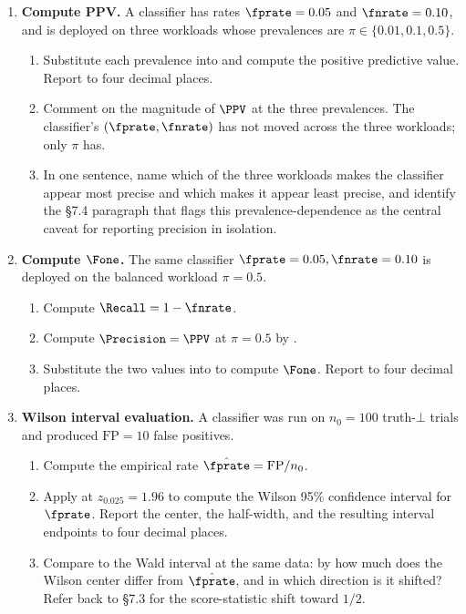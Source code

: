 \begin{enumerate}


\item \exstar
\label{ex:ch7-1}
\textbf{Compute PPV.}
A classifier has rates $\fprate = 0.05$ and $\fnrate = 0.10$, and is
deployed on three workloads whose prevalences are $\pi \in \{0.01,
0.1, 0.5\}$.
\begin{enumerate}
  \item[(a)] Substitute each prevalence into  and
    compute the positive predictive value. Report to four decimal
    places.
  \item[(b)] Comment on the magnitude of $\PPV$ at the three
    prevalences. The classifier's $(\fprate, \fnrate)$ has not
    moved across the three workloads; only $\pi$ has.
  \item[(c)] In one sentence, name which of the three workloads
    makes the classifier appear most precise and which makes it
    appear least precise, and identify the §7.4 paragraph that
    flags this prevalence-dependence as the central caveat for
    reporting precision in isolation.
\end{enumerate}

\item \exstar
\label{ex:ch7-2}
\textbf{Compute $\Fone$.}
The same classifier $\fprate = 0.05, \fnrate = 0.10$ is deployed on
the balanced workload $\pi = 0.5$.
\begin{enumerate}
  \item[(a)] Compute $\Recall = 1 - \fnrate$.
  \item[(b)] Compute $\Precision = \PPV$ at $\pi = 0.5$ by
    .
  \item[(c)] Substitute the two values into  to compute
    $\Fone$. Report to four decimal places.
\end{enumerate}

\item \exstar
\label{ex:ch7-3}
\textbf{Wilson interval evaluation.}
A classifier was run on $n_0 = 100$ truth-$\bot$ trials and produced
$\mathrm{FP} = 10$ false positives.
\begin{enumerate}
  \item[(a)] Compute the empirical rate
    $\hat{\fprate} = \mathrm{FP}/n_0$.
  \item[(b)] Apply  at $z_{0.025} = 1.96$ to
    compute the Wilson 95\% confidence interval for $\fprate$.
    Report the center, the half-width, and the resulting interval
    endpoints to four decimal places.
  \item[(c)] Compare to the Wald interval  at the
    same data: by how much does the Wilson center differ from
    $\hat{\fprate}$, and in which direction is it shifted? Refer
    back to §7.3 for the score-statistic shift toward $1/2$.
\end{enumerate}


\end{enumerate}
